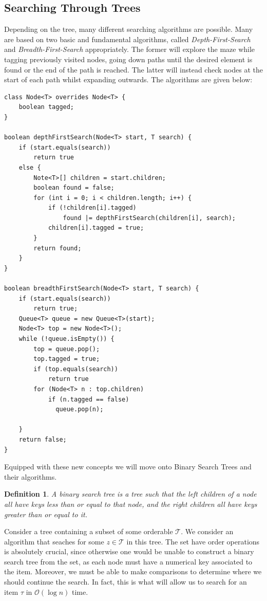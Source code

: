 \documentclass[9pt]{article} %
\newtheorem*{def_}{Definition}
\newcommand{\T}{\mathcal{T}}
\begin{document}
		\subsection{Searching Through Trees}
		Depending on the tree, many different searching algorithms are possible. Many are based on two basic and fundamental algorithms, called \emph{Depth-First-Search} and \emph{Breadth-First-Search} appropriately. The former will explore the maze while tagging previously visited nodes, going down paths until the desired element is found or the end of the path is reached. The latter will instead check nodes at the start of each path whilst expanding outwards. The algorithms are given below:
		\begin{lstlisting}
class Node<T> overrides Node<T> {
	boolean tagged;
}

boolean depthFirstSearch(Node<T> start, T search) {
	if (start.equals(search))
		return true
	else {
		Note<T>[] children = start.children;
		boolean found = false;
		for (int i = 0; i < children.length; i++) {
			if (!children[i].tagged)
				found |= depthFirstSearch(children[i], search);
			children[i].tagged = true;
		}
		return found;
	}
}

boolean breadthFirstSearch(Node<T> start, T search) {
	if (start.equals(search))
		return true;
	Queue<T> queue = new Queue<T>(start);
	Node<T> top = new Node<T>();
	while (!queue.isEmpty()) {
		top = queue.pop();
		top.tagged = true;
		if (top.equals(search))
			return true
		for (Node<T> n : top.children) 
			if (n.tagged == false)
			  queue.pop(n);
		
	}
	return false;
}

		\end{lstlisting}
		Equipped with these new concepts we will move onto Binary Search Trees and their algorithms.
	\begin{def_}
		A binary search tree is a tree such that the left children of a node all have keys less than or equal to that node, and the right children all have keys greater than or equal to it.
	\end{def_}
	 Consider a tree containing a subset of some orderable $\T$. We consider an algorithm that seaches for some $z \in \T$ in this tree. The set have order operations is absolutely crucial, since otherwise one would be unable to construct a binary search tree from the set, as each node must have a numerical key associated to the item. Moreover, we must be able to make comparisons to determine where we should continue the search. In fact, this is what will allow us to search for an item $\tau$ in $\mathcal{O}(\log{n})$ time.
\end{document}
